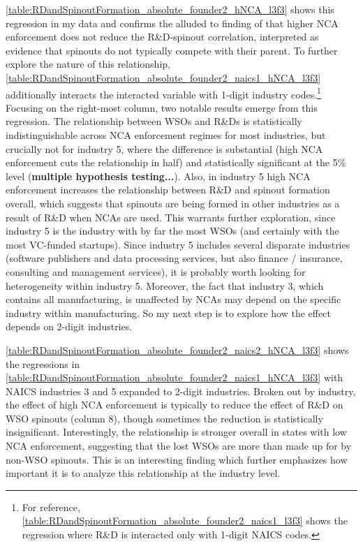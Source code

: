 \autoref{table:RDandSpinoutFormation_absolute_founder2_hNCA_l3f3} shows this regression in my data and confirms the alluded to finding of \cite{babina_entrepreneurial_2019} that higher NCA enforcement does not reduce the R\&D-spinout correlation, interpreted as evidence that spinouts do not typically compete with their parent. To further explore the nature of this relationship, \autoref{table:RDandSpinoutFormation_absolute_founder2_naics1_hNCA_l3f3} additionally interacts the interacted variable with 1-digit industry codes.\footnote{For reference, \autoref{table:RDandSpinoutFormation_absolute_founder2_naics1_l3f3} shows the regression where R\&D is interacted only with 1-digit NAICS codes.} Focusing on the right-most column, two notable results emerge from this regression. The relationship between WSOs and R\&Ds is statistically indistinguishable across NCA enforcement regimes for most industries, but crucially not for industry 5, where the difference is substantial (high NCA enforcement cuts the relationship in half) and statistically significant at the 5\% level (\textbf{multiple hypothesis testing...}). Also, in industry 5 high NCA enforcement increases the relationship between R\&D and spinout formation  overall, which suggests that spinouts are being formed in other industries as a result of R\&D when NCAs are used. This warrants further exploration, since industry 5 is the industry with by far the most WSOs (and certainly with the most VC-funded startups). Since industry 5 includes several disparate industries (software publishers and data processing services, but also finance / insurance, consulting and management services), it is probably worth looking for heterogeneity within industry 5. Moreover, the fact that industry 3, which contains all manufacturing, is unaffected by NCAs may depend on the specific industry within manufacturing. So my next step is to explore how the effect depends on 2-digit industries.

\autoref{table:RDandSpinoutFormation_absolute_founder2_naics2_hNCA_l3f3} shows the regressions in \autoref{table:RDandSpinoutFormation_absolute_founder2_naics1_hNCA_l3f3} with NAICS industries 3 and 5 expanded to 2-digit industries. Broken out by industry, the effect of high NCA enforcement is typically to reduce the effect of R\&D on WSO spinouts (column 8), though sometimes the reduction is statistically insignificant. Interestingly, the relationship is stronger overall in states with low NCA enforcement, suggesting that the lost WSOs are more than made up for by non-WSO spinouts. This is an interesting finding which further emphasizes how important it is to analyze this relationship at the industry level. 

